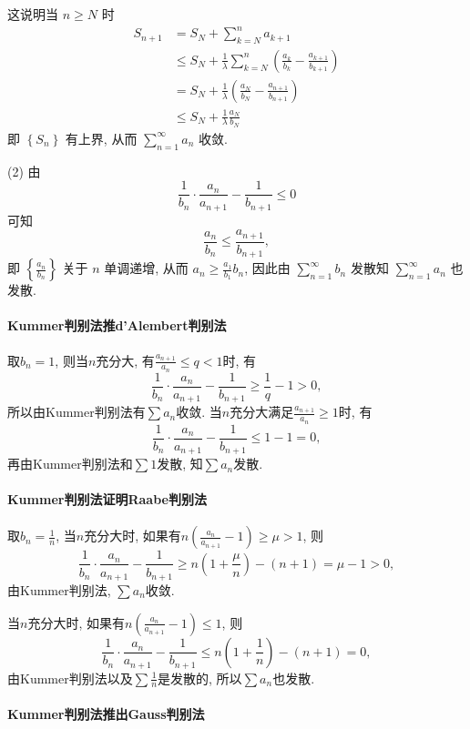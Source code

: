 这说明当 $n\geqslant N$ 时 
\[
\begin{aligned}S_{n+1} & =S_{N}+\sum_{k=N}^{n}a_{k+1}\\
 & \leqslant S_{N}+\frac{1}{\lambda}\sum_{k=N}^{n}\left(\frac{a_{k}}{b_{k}}-\frac{a_{k+1}}{b_{k+1}}\right)\\
 & =S_{N}+\frac{1}{\lambda}\left(\frac{a_{N}}{b_{N}}-\frac{a_{n+1}}{b_{n+1}}\right)\\
 & \leqslant S_{N}+\frac{1}{\lambda}\frac{a_{N}}{b_{N}}
\end{aligned}
\]
即 $\left\{ S_{n}\right\} $ 有上界, 从而 $\sum_{n=1}^{\infty}a_{n}$ 收敛. 

(2) 由 
\[
\frac{1}{b_{n}}\cdot\frac{a_{n}}{a_{n+1}}-\frac{1}{b_{n+1}}\leqslant0
\]
可知 
\[
\frac{a_{n}}{b_{n}}\leqslant\frac{a_{n+1}}{b_{n+1}},
\]
即 $\left\{ \frac{a_{n}}{b_{n}}\right\} $ 关于 $n$ 单调递增, 从而 $a_{n}\geqslant\frac{a_{1}}{b_{1}}b_{n}$,
因此由 $\sum_{n=1}^{\infty}b_{n}$ 发散知 $\sum_{n=1}^{\infty}a_{n}$ 也发散.

\paragraph{Kummer判别法推d'Alembert判别法}

取$b_{n}=1$, 则当$n$充分大, 有$\frac{a_{n+1}}{a_{n}}\le q<1$时, 有
\[
\frac{1}{b_{n}}\cdot\frac{a_{n}}{a_{n+1}}-\frac{1}{b_{n+1}}\ge\frac{1}{q}-1>0,
\]
所以由Kummer判别法有$\sum a_{n}$收敛. 当$n$充分大满足$\frac{a_{n+1}}{a_{n}}\ge1$时,
有
\[
\frac{1}{b_{n}}\cdot\frac{a_{n}}{a_{n+1}}-\frac{1}{b_{n+1}}\le1-1=0,
\]
再由Kummer判别法和$\sum1$发散, 知$\sum a_{n}$发散.

\paragraph{Kummer判别法证明Raabe判别法}

取$b_{n}=\frac{1}{n}$, 当$n$充分大时, 如果有$n\left(\frac{a_{n}}{a_{n+1}}-1\right)\ge\mu>1$,
则
\[
\frac{1}{b_{n}}\cdot\frac{a_{n}}{a_{n+1}}-\frac{1}{b_{n+1}}\ge n\left(1+\frac{\mu}{n}\right)-(n+1)=\mu-1>0,
\]
由Kummer判别法, $\sum a_{n}$收敛.

当$n$充分大时, 如果有$n\left(\frac{a_{n}}{a_{n+1}}-1\right)\le1$, 则
\[
\frac{1}{b_{n}}\cdot\frac{a_{n}}{a_{n+1}}-\frac{1}{b_{n+1}}\le n\left(1+\frac{1}{n}\right)-(n+1)=0,
\]
由Kummer判别法以及$\sum\frac{1}{n}$是发散的, 所以$\sum a_{n}$也发散.

\paragraph{Kummer判别法推出Gauss判别法}

